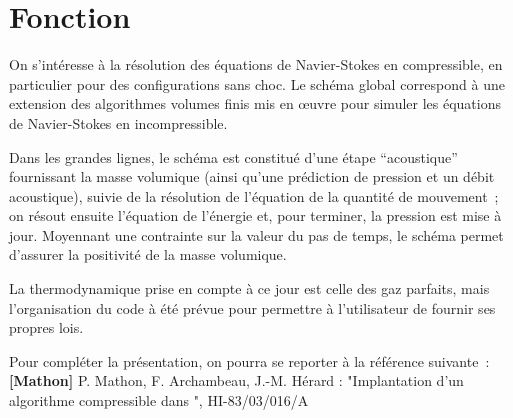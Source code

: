 
%
%
%
%


\label{ap:cfbase}

\section*{Fonction}


On s'intéresse à la résolution des équations de Navier-Stokes en compressible,
en particulier pour des configurations sans choc. Le schéma global correspond à une
extension des algorithmes volumes finis mis en \oe uvre pour simuler les
équations de Navier-Stokes en incompressible.

Dans les grandes lignes, le schéma est constitué d'une étape
``acoustique'' fournissant la masse volumique (ainsi qu'une prédiction de
pression et un débit acoustique), suivie de la résolution de l'équation de
la quantité de mouvement~; on résout ensuite l'équation de l'énergie
et, pour terminer, la pression est mise à jour.
Moyennant une contrainte sur la valeur du pas de temps, le schéma permet
d'assurer la positivité de la masse volumique.

La thermodynamique prise en compte à ce jour est celle des gaz parfaits, mais
l'organisation du code à été  prévue pour permettre à l'utilisateur de
fournir ses propres lois.

Pour compléter la présentation, on pourra se reporter à la référence
suivante~: \\
\textbf{[Mathon]} P. Mathon, F. Archambeau, J.-M. Hérard : "Implantation d'un
algorithme compressible dans \CS", HI-83/03/016/A

